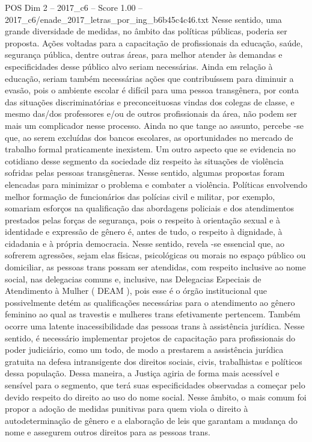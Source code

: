 \begin{textsample}{POS Dim 2 – 2017\_c6 – Score 1.00 – 2017\_c6/enade\_2017\_letras\_por\_ing\_b6b45c4c46.txt}
Nesse sentido, uma grande diversidade de medidas, no âmbito das políticas públicas, poderia ser proposta.
Ações voltadas para a capacitação de profissionais da educação, saúde, segurança pública, dentre outras áreas, para melhor atender às demandas e especificidades desse público alvo seriam necessárias.
Ainda em relação à educação, seriam também necessárias ações que contribuíssem para diminuir a evasão, pois o ambiente escolar é difícil para uma pessoa transgênera, por conta das situações discriminatórias e preconceituosas vindas dos colegas de classe, e mesmo das/dos professores e/ou de outros profissionais da área, não podem ser mais um complicador nesse processo.
Ainda no que tange ao assunto, percebe -se que, ao serem excluídas dos bancos escolares, as oportunidades no mercado de trabalho formal praticamente inexistem.
Um outro aspecto que se evidencia no cotidiano desse segmento da sociedade diz respeito às situações de violência sofridas pelas pessoas transgêneras.
Nesse sentido, algumas propostas foram elencadas para minimizar o problema e combater a violência.
Políticas envolvendo melhor formação de funcionários das polícias civil e militar, por exemplo, somariam esforços na qualificação das abordagens policiais e dos atendimentos prestados pelas forças de segurança, pois o respeito à orientação sexual e à identidade e expressão de gênero é, antes de tudo, o respeito à dignidade, à cidadania e à própria democracia.
Nesse sentido, revela -se essencial que, ao sofrerem agressões, sejam elas físicas, psicológicas ou morais no espaço público ou domiciliar, as pessoas trans possam ser atendidas, com respeito inclusive ao nome social, nas delegacias comuns e, inclusive, nas Delegacias Especiais de Atendimento à Mulher ( DEAM ), pois esse é o órgão institucional que possivelmente detém as qualificações necessárias para o atendimento ao gênero feminino ao qual as travestis e mulheres trans efetivamente pertencem.
Também ocorre uma latente inacessibilidade das pessoas trans à assistência jurídica.
Nesse sentido, é necessário implementar projetos de capacitação para profissionais do poder judiciário, como um todo, de modo a prestarem a assistência jurídica gratuita na defesa intransigente dos direitos sociais, civis, trabalhistas e políticos dessa população.
Dessa maneira, a Justiça agiria de forma mais acessível e sensível para o segmento, que terá suas especificidades observadas a começar pelo devido respeito do direito ao uso do nome social.
Nesse âmbito, o mais comum foi propor a adoção de medidas punitivas para quem viola o direito à autodeterminação de gênero e a elaboração de leis que garantam a mudança do nome e assegurem outros direitos para as pessoas trans.

\end{textsample}
